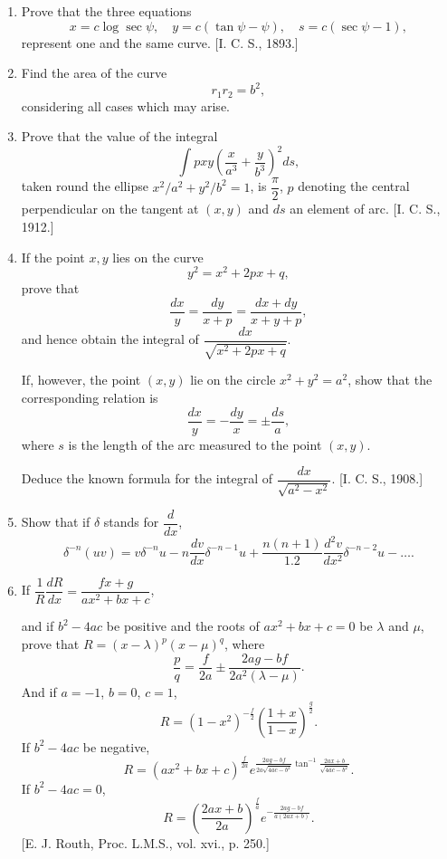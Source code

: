 \documentclass[11pt, a4paper]{article}
\newcommand{\source}[1]{\hfill\textnormal{[#1]}}
\begin{document}
\begin{enumerate}[leftmargin=2em]

\item Prove that the three equations
\[
x=c\log\sec\psi,\quad y=c(\tan\psi-\psi),\quad s=c(\sec\psi-1),
\]
represent one and the same curve. \source{I. C. S., 1893.}

\item Find the area of the curve
\[
r_1r_2=b^2,
\]
considering all cases which may arise.

\item Prove that the value of the integral
\[
\int pxy\left(\frac{x}{a^3}+\frac{y}{b^3}\right)^2ds,
\]
taken round the ellipse $x^2/a^2+y^2/b^2=1$, is $\dfrac{\pi}{2}$, $p$ denoting the central perpendicular on the tangent at $(x,y)$ and $ds$ an element of arc. \source{I. C. S., 1912.}

\item If the point $x, y$ lies on the curve
\[
y^2=x^2+2px+q,
\]
prove that
\[
\frac{dx}{y}=\frac{dy}{x+p}=\frac{dx+dy}{x+y+p},
\]
and hence obtain the integral of $\dfrac{dx}{\sqrt{x^2+2px+q}}$.

If, however, the point $(x,y)$ lie on the circle $x^2+y^2=a^2$, show that the corresponding relation is
\[
\frac{dx}{y}=-\frac{dy}{x}=\pm\frac{ds}{a},
\]
where $s$ is the length of the arc measured to the point $(x,y)$.

Deduce the known formula for the integral of $\dfrac{dx}{\sqrt{a^2-x^2}}$. \source{I. C. S., 1908.}

\item Show that if $\delta$ stands for $\dfrac{d}{dx}$,
\[
\delta^{-n}(uv)=v\delta^{-n}u-n\frac{dv}{dx}\delta^{-n-1}u+\frac{n(n+1)}{1.2}\frac{d^2v}{dx^2}\delta^{-n-2}u-\dots.
\]

\item If $\dfrac1R\dfrac{dR}{dx}=\dfrac{fx+g}{ax^2+bx+c}$,

and if $b^2-4ac$ be positive and the roots of $ax^2+bx+c=0$ be $\lambda$ and $\mu$, prove that $R=(x-\lambda)^p(x-\mu)^q$, where
\[
\frac{p}{q}=\frac{f}{2a}\pm\frac{2ag-bf}{2a^2(\lambda-\mu)}.
\]
And if $a=-1$, $b=0$, $c=1$,
\[
R=(1-x^2)^{-\frac{f}{2}}\left(\frac{1+x}{1-x}\right)^{\frac{g}{2}}.
\]
If $b^2-4ac$ be negative,
\[
R=(ax^2+bx+c)^{\frac{f}{2a}}e^{\frac{2ag-bf}{2a\sqrt{4ac-b^2}}\tan^{-1}\frac{2ax+b}{\sqrt{4ac-b^2}}}.
\]
If $b^2-4ac=0$,
\[
R=\left(\frac{2ax+b}{2a}\right)^{\frac{f}{a}}e^{-\frac{2ag-bf}{a(2ax+b)}}.
\]
\source{E. J. Routh, Proc. L.M.S., vol. xvi., p. 250.}


\end{enumerate}
\end{document}
